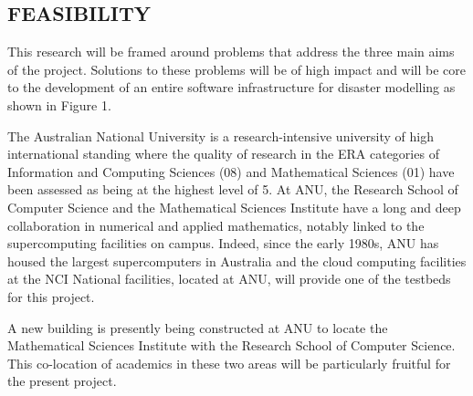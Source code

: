 \iffalse
\subsection*{RESEARCH ENVIRONMENT}
\fi

\subsection*{FEASIBILITY}

\iffalse The project is feasible due to the rigorous design with distinct tasks
and timelines which address the identified, well understood challenges
in this discipline. 
\fi

\iffalse
The project brings together a multi-disciplinary
team of experts in mathematics, software engineering, human computer interaction and high
performance computing.
\fi

This research will be framed around problems that address the three main aims of the project. Solutions to these problems will be of high impact and will be core to the development of an entire software infrastructure for disaster modelling as shown in Figure 1.


The Australian National University is a research-intensive university
of high international standing where the quality of research in the ERA categories of 
 Information and Computing
Sciences (08) and Mathematical Sciences (01) have been assessed as
being at the highest level of 5. At ANU, the Research School of
Computer Science and the Mathematical Sciences Institute have a long
and deep collaboration in numerical and applied mathematics, notably  linked to the supercomputing
facilities on campus. Indeed, since the early 1980s, ANU has housed the
largest supercomputers in Australia and the cloud computing facilities at the NCI National
facilities, located at ANU, will provide one of the testbeds for this
project.

A new building is presently being constructed at ANU to
locate the Mathematical Sciences Institute with the Research
School of Computer Science. This co-location of academics in these two
areas will be particularly fruitful for the present project.
